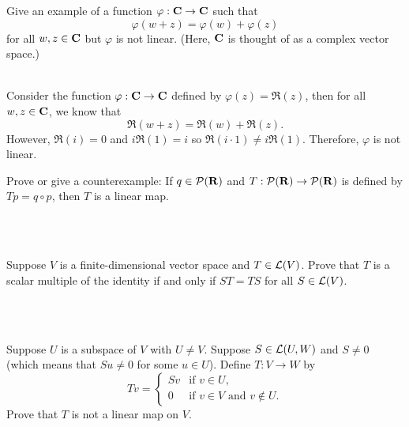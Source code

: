 \begin{exercise}
    Give an example of a function $\varphi : \mathbf{C} \to \mathbf{C}$ such that
    $$\varphi(w + z) = \varphi(w) + \varphi(z)$$
    for all $w,z \in \mathbf{C}$ but $\varphi$ is not linear. (Here, $\mathbf{C}$ is thought of as a complex vector space.)\\
\end{exercise}

\begin{solution}
    \\ Consider the function $\varphi : \mathbf{C} \to \mathbf{C}$ defined by $\varphi(z) = \Re(z)$, then for all $w,z \in \mathbf{C}$, we know that
    $$\Re(w + z) = \Re(w) + \Re(z).$$
    However, $\Re(i) = 0$ and $i \Re(1) = i$ so $\Re(i \cdot 1) \neq i\Re(1)$. Therefore, $\varphi$ is not linear. \\
\end{solution}

\begin{exercise}
    Prove or give a counterexample: If $q \in \mathcal{P}(\mathbf{R})$ and $T: \mathcal{P}(\mathbf{R}) \to \mathcal{P}(\mathbf{R})$ is defined by $Tp = q \circ p$, then $T$ is a linear map. \\
\end{exercise}

\begin{solution}
    \\ \td \\
\end{solution}

\begin{exercise}
    Suppose $V$ is a finite-dimensional vector space and $T \in \mathcal{L}(V)$. Prove that $T$ is a scalar multiple of the identity if and only if $ST = TS$ for all $S \in \mathcal{L}(V)$. \\
\end{exercise}

\begin{solution}
    \\ \td \\
\end{solution}

\begin{exercise}
    Suppose $U$ is a subspace of $V$ with $U \neq V$. Suppose $S \in \mathcal{L}(U,W)$ and $S \neq 0$ (which means that $Su \neq 0$ for some $u \in U$). Define $T : V \to W$ by
    $$Tv = \begin{cases} Sv & \text{if } v \in U, \\ 0 & \text{if } v \in V \text{ and } v \notin U. \end{cases}$$
    Prove that $T$ is not a linear map on $V$. \\
\end{exercise}

